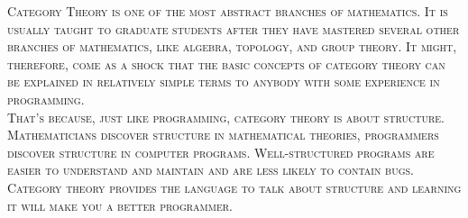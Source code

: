 
{
\fontsize{16}{18}\selectfont
\scshape{Category Theory}\normalfont\sffamily{}
is one of the most abstract branches of mathematics. It is usually taught to
graduate students after they have mastered several other branches of mathematics,
like algebra, topology, and group theory. It might, therefore, come as a shock that
the basic concepts of category theory can be explained in relatively simple terms
to anybody with some experience in programming. \\

That's because, just like programming,
category theory is about structure. Mathematicians discover structure in mathematical
theories, programmers discover structure in computer programs. Well-structured programs
are easier to understand and maintain and are less likely to contain bugs. Category theory
provides the language to talk about structure and learning it will make you
a better programmer.
\vfil

}
